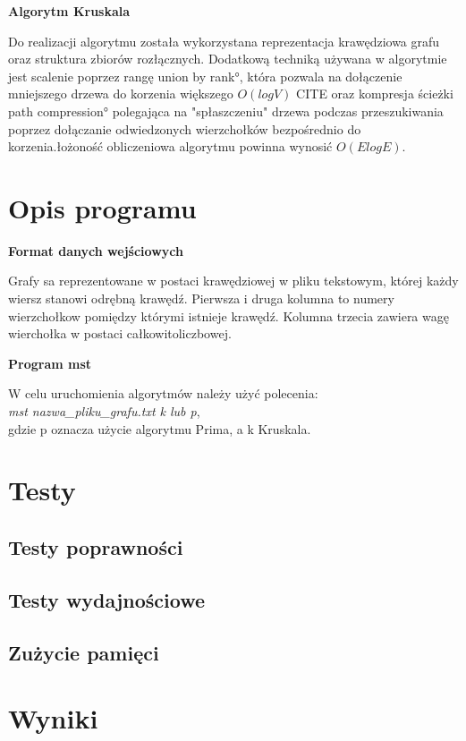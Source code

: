 \documentclass[a4paper, 10pt]{article}
\begin{document}
{\bf{Algorytm Kruskala}}

Do realizacji algorytmu została wykorzystana reprezentacja krawędziowa grafu oraz struktura zbiorów rozłącznych. 
Dodatkową techniką używana w algorytmie jest scalenie poprzez rangę \ang{union by rank}, która pozwala na dołączenie mniejszego drzewa 
do korzenia większego $O(logV)$ CITE oraz kompresja ścieżki \ang{path compression} polegająca na "spłaszczeniu" drzewa podczas przeszukiwania  poprzez dołączanie 
odwiedzonych wierzchołków bezpośrednio do korzenia.łożoność obliczeniowa algorytmu powinna wynosić $O(ElogE)$.



\section{Opis programu}

{\bf{Format danych wejściowych}}

Grafy sa reprezentowane w postaci krawędziowej w pliku tekstowym, której
każdy wiersz stanowi odrębną krawędź. Pierwsza i druga kolumna to numery wierzchołkow pomiędzy którymi istnieje krawędź.
Kolumna trzecia zawiera wagę wierchołka w postaci całkowitoliczbowej.

{\bf{Program mst}}

W celu uruchomienia algorytmów należy użyć polecenia: \\
{\it mst nazwa\_pliku\_grafu.txt k lub p}, \\
gdzie p oznacza użycie algorytmu Prima, a k Kruskala.





\section{Testy}
\subsection{Testy poprawności}
\subsection{Testy wydajnościowe}

\subsection{Zużycie pamięci}

\section{Wyniki}
\end{document}
